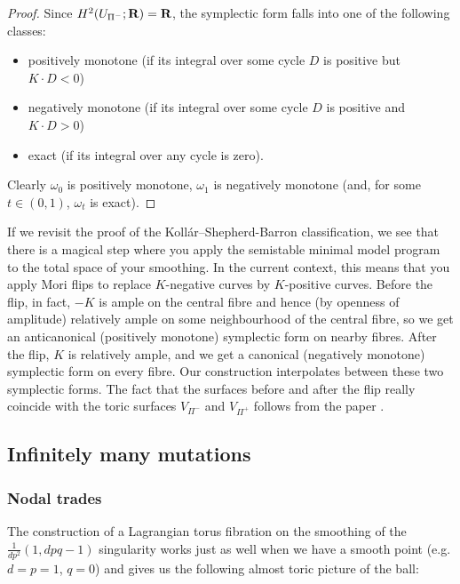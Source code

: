 \documentclass{article}
\begin{document}
\begin{proof}
Since \(H^2(U_{\Pi^-};\mathbf{R})=\mathbf{R}\), the symplectic form falls into one
of the following classes:
\begin{itemize}
\item positively monotone (if its integral over some cycle \(D\) is
positive but \(K\cdot D<0\))
\item negatively monotone (if its integral over some cycle \(D\) is
positive and \(K\cdot D>0\))
\item exact (if its integral over any cycle is zero).
\end{itemize}
Clearly \(\omega_0\) is positively monotone, \(\omega_1\) is
negatively monotone (and, for some \(t\in(0,1)\), \(\omega_t\) is
exact). \qedhere


\end{proof}
\begin{Remark}
If we revisit the proof of the Koll\'{a}r--Shepherd-Barron
classification, we see that there is a magical step where you apply
the semistable minimal model program to the total space of your
smoothing. In the current context, this means that you apply Mori
flips to replace \(K\)-negative curves by \(K\)-positive
curves. Before the flip, in fact, \(-K\) is ample on the central
fibre and hence (by openness of amplitude) relatively ample on some
neighbourhood of the central fibre, so we get an anticanonical
(positively monotone) symplectic form on nearby fibres. After the
flip, \(K\) is relatively ample, and we get a canonical (negatively
monotone) symplectic form on every fibre. Our construction
interpolates between these two symplectic forms. The fact that the
surfaces before and after the flip really coincide with the toric
surfaces \(V_{\Pi^-}\) and \(V_{\Pi^+}\) follows from the paper
\cite{HTU}.


\end{Remark}
\subsection{Infinitely many mutations}


\subsubsection{Nodal trades}


The construction of a Lagrangian torus fibration on the smoothing of
the \(\frac{1}{dp^2}(1,dpq-1)\) singularity works just as well when we
have a smooth point (e.g. \(d=p=1\), \(q=0\)) and gives us the
following almost toric picture of the ball:
\end{document}
